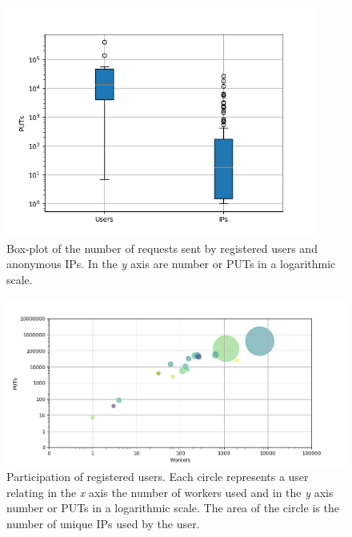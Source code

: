 \documentclass{llncs}
\begin{document}
\begin{figure}[t]
    \centering
        \includegraphics[width=4in]{img/puts_box.png}
    \caption{ Box-plot of the number of requests sent by registered users and anonymous IPs.
     In the \emph{y} axis are number or PUTs in a logarithmic scale.
    }
    \label{fig:box}
\end{figure}

\begin{figure}[t]
    \centering
        \includegraphics[width=5in]{img/workers_put_ip.png}
    \caption{ Participation of registered users. Each circle represents a user relating  
        in the \emph{x} axis the number of workers used and in the \emph{y} axis 
        number or PUTs in a logarithmic scale. The area of the circle is the number 
        of unique IPs used by the user.
    }
    \label{fig:worker-put-ips}
\end{figure}
\end{document}
